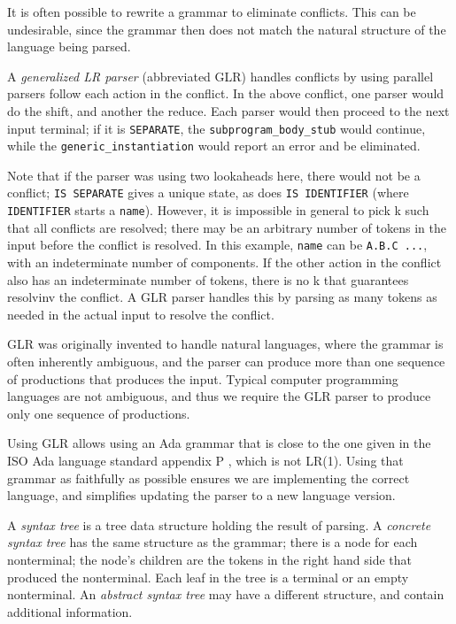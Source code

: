 \documentclass[authordraft]{acmart}
\begin{document}
It is often possible to rewrite a grammar to eliminate conflicts. This
can be undesirable, since the grammar then does not match the natural
structure of the language being parsed.

A {\it generalized LR parser} \citet{Tomita_1986} (abbreviated GLR)
handles conflicts by using parallel parsers follow each action in the
conflict. In the above conflict, one parser would do the shift, and
another the reduce. Each parser would then proceed to the next input
terminal; if it is \verb|SEPARATE|, the \verb|subprogram_body_stub|
would continue, while the \verb|generic_instantiation| would report an
error and be eliminated.

Note that if the parser was using two lookaheads here, there would not
be a conflict; \verb|IS SEPARATE| gives a unique state, as does
\verb|IS IDENTIFIER| (where \verb|IDENTIFIER| starts a \verb|name|).
However, it is impossible in general to pick k such that all conflicts
are resolved; there may be an arbitrary number of tokens in the input
before the conflict is resolved. In this example, \verb|name| can be
\verb|A.B.C ...|, with an indeterminate number of components. If the
other action in the conflict also has an indeterminate number of
tokens, there is no k that guarantees resolvinv the conflict. A GLR
parser handles this by parsing as many tokens as needed in the actual
input to resolve the conflict.

GLR was originally invented to handle natural languages, where the
grammar is often inherently ambiguous, and the parser can produce
more than one sequence of productions that produces the input. Typical
computer programming languages are not ambiguous, and thus we require
the GLR parser to produce only one sequence of productions.

Using GLR allows using an Ada grammar that is close to the one given
in the ISO Ada language standard appendix P \citep{Ada_2012}, which is
not LR(1). Using that grammar as faithfully as possible ensures we are
implementing the correct language, and simplifies updating the parser
to a new language version.

A {\it syntax tree} is a tree data structure holding the result of
parsing. A {\it concrete syntax tree} has the same structure as the
grammar; there is a node for each nonterminal; the node's children are
the tokens in the right hand side that produced the nonterminal. Each
leaf in the tree is a terminal or an empty nonterminal. An {\it
abstract syntax tree} may have a different structure, and contain
additional information.
\end{document}
